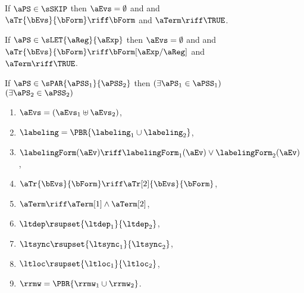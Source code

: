 \begin{figure}
  \raggedright

  \noindent
  If $\aPS\in\sSKIP$ then $\aEvs = \emptyset$ and
  and $\aTr{\bEvs}{\bForm} \riff \bForm$
  and $\aTerm\riff\TRUE$.
  \medskip

  \noindent
  If $\aPS\in\sLET{\aReg}{\aExp}$ then $\aEvs = \emptyset$ and
  and $\aTr{\bEvs}{\bForm} \riff \bForm[\aExp/\aReg]$
  and $\aTerm\riff\TRUE$.
  \medskip

  \noindent
  If $\aPS \in \sPAR{\aPSS_1}{\aPSS_2}$ then  
  $(\exists\aPS_1\in\aPSS_1)$ $(\exists\aPS_2\in\aPSS_2)$
  \begin{multicols}{2}
    \begin{enumerate}[topsep=0pt,label=(\textsc{p}\arabic*),ref=\textsc{p}\arabic*]
    \item \label{par-E}
      $\aEvs = (\aEvs_1\uplus\aEvs_2)$,
    \item \label{par-lambda}
      ${\labeling}=\PBR{{\labeling_1}\cup {\labeling_2}}$, 
    \item \label{par-kappa}
      $\labelingForm(\aEv) \riff \labelingForm_1(\aEv)\lor \labelingForm_2(\aEv)$,
    \item \label{par-tau}
      $\aTr{\bEvs}{\bForm} \riff \aTr[2]{\bEvs}{\bForm}$,
    \item \label{par-term}
      $\aTerm \riff \aTerm[1]\land\aTerm[2]$,
    \item \label{par-ledep}
      ${\ltdep}\rsupset{\ltdep_1}{\ltdep_2}$, 
    \item \label{par-lesync}
      ${\ltsync}\rsupset{\ltsync_1}{\ltsync_2}$, 
    \item \label{par-leloc}
      ${\ltloc}\rsupset{\ltloc_1}{\ltloc_2}$, 
    \item \label{par-rmw}
      ${\rrmw}=\PBR{{\rrmw_1}\cup{\rrmw_2}}$.
    \end{enumerate}    
  \end{multicols}
  \medskip


\end{figure}
